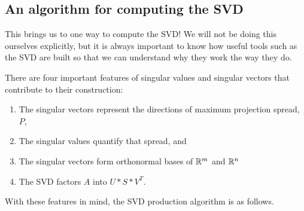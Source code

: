 \documentclass{ximera}
\begin{document}
\subsection*{An algorithm for computing the SVD}

This brings us to one way to compute the SVD! We will not be doing this ourselves explicitly, but it is always important to know how useful tools such as the SVD are built so that we can understand why they work the way they do. 

There are four important features of singular values and singular vectors that contribute to their construction: \begin{enumerate}
  \item The singular vectors represent the directions of maximum projection spread, $P$,
  \item The singular values quantify that spread, and 
  \item The singular vectors form orthonormal bases of $\mathbb{R}^m$ and $\mathbb{R}^n$
  \item The SVD factors $A$ into $U*S*V^T$.
\end{enumerate}

With these features in mind, the SVD production algorithm is as follows.
\end{document}
